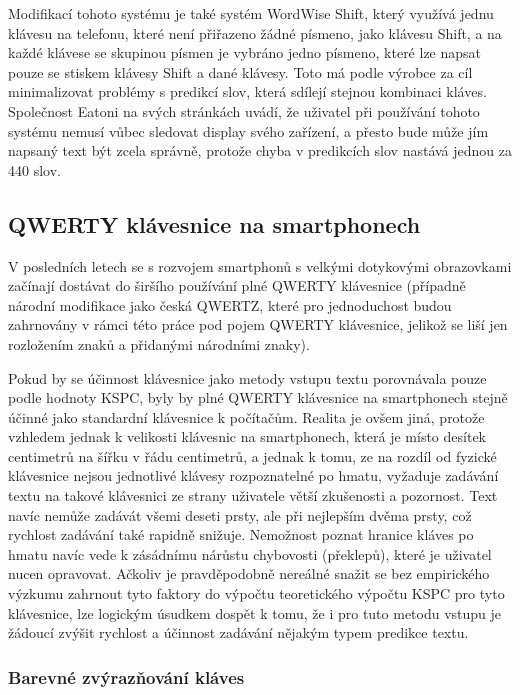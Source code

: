 \documentclass[a4paper,11pt]{article}
\begin{document}
Modifikací tohoto systému je také systém WordWise Shift, který využívá jednu klávesu na telefonu, které není přiřazeno žádné písmeno, jako klávesu Shift, a na každé klávese se skupinou písmen je vybráno jedno písmeno, které lze napsat pouze se stiskem klávesy Shift a dané klávesy. Toto má podle výrobce za cíl minimalizovat problémy s predikcí slov, která sdílejí stejnou kombinaci kláves. Společnost Eatoni na svých stránkách uvádí, že uživatel při používání tohoto systému nemusí vůbec sledovat display svého zařízení, a přesto bude může jím napsaný text být zcela správně, protože chyba v predikcích slov nastává jednou za 440 slov. \cite{Ward2012} 

\subsection{QWERTY klávesnice na smartphonech}

V posledních letech se s rozvojem smartphonů s velkými dotykovými obrazovkami začínají dostávat do širšího používání plné QWERTY klávesnice (případně národní modifikace jako česká QWERTZ, které pro jednoduchost budou zahrnovány v rámci této práce pod pojem QWERTY klávesnice, jelikož se liší jen rozložením znaků a přidanými národními znaky). 

Pokud by se účinnost klávesnice jako metody vstupu textu porovnávala pouze podle hodnoty KSPC, byly by plné QWERTY klávesnice na smartphonech stejně účinné jako standardní klávesnice k počítačům. Realita je ovšem jiná, protože vzhledem jednak k velikosti klávesnic na smartphonech, která je místo desítek centimetrů na šířku v řádu centimetrů, a jednak k tomu, ze na rozdíl od fyzické klávesnice nejsou jednotlivé klávesy rozpoznatelné po hmatu, vyžaduje zadávání textu na takové klávesnici ze strany uživatele větší zkušenosti a pozornost. Text navíc nemůže zadávát všemi deseti prsty, ale při nejlepším dvěma prsty, což rychlost zadávání také rapidně snižuje. Nemožnost poznat hranice kláves po hmatu navíc vede k zásádnímu nárůstu chybovosti (překlepů), které je uživatel nucen opravovat. Ačkoliv je pravděpodobně nereálné snažit se bez empirického výzkumu zahrnout tyto faktory do výpočtu teoretického výpočtu KSPC pro tyto klávesnice, lze logickým úsudkem dospět k tomu, že i pro tuto metodu vstupu je žádoucí zvýšit rychlost a účinnost zadávání nějakým typem predikce textu.

\subsubsection{Barevné zvýrazňování kláves}
\end{document}
